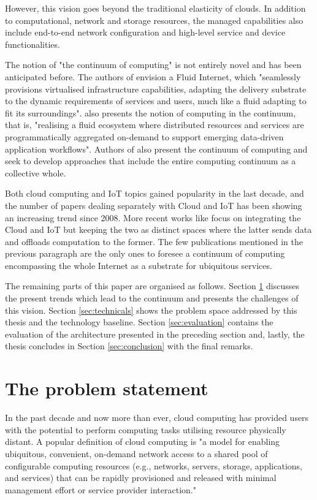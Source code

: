 \documentclass{ieeeaccess}
\begin{document}
However, this vision goes beyond the traditional elasticity of clouds. In addition to computational, network and storage resources, the managed capabilities also include end-to-end network configuration and high-level service and device functionalities.

The notion of "the continuum of computing" is not entirely novel and has been anticipated before. The authors of \cite{fluid-internet} envision a Fluid Internet, which "seamlessly provisions virtualised infrastructure capabilities, adapting the delivery substrate to the dynamic requirements of services and users, much like a fluid adapting to fit its surroundings". \cite{computing-in-continuum} also presents the notion of computing in the continuum, that is, "realising a fluid ecosystem where distributed resources and services are programmatically aggregated on-demand to support emerging data-driven application workflows". Authors of \cite{harnessing-continuum} also present the continuum of computing and seek to develop approaches that include the entire computing continuum as a collective whole.

Both cloud computing and IoT topics gained popularity in the last decade, and the number of papers dealing separately with Cloud and IoT has been showing an increasing trend since 2008. More recent works like \cite{cloud-iot} focus on integrating the Cloud and IoT but keeping the two as distinct spaces where the latter sends data and offloads computation to the former. The few publications mentioned in the previous paragraph are the only ones to foresee a continuum of computing encompassing the whole Internet as a substrate for ubiquitous services.

The remaining parts of this paper are organised as follows. Section \ref{sec:challenges} discusses the present trends which lead to the continuum and presents the challenges of this vision. Section \ref{sec:technicals} shows the problem space addressed by this thesis and the technology baseline. Section \ref{sec:evaluation} contains the evaluation of the architecture presented in the preceding section and, lastly, the thesis concludes in Section \ref{sec:conclusion} with the final remarks.

\section{The problem statement}
\label{sec:challenges}

In the past decade and now more than ever, cloud computing has provided users with the potential to perform computing tasks utilising resource physically distant. A popular definition of cloud computing \cite{cloud-def} is "a model for enabling ubiquitous, convenient, on-demand network access to a shared pool of configurable computing resources (e.g., networks, servers, storage, applications, and services) that can be rapidly provisioned and released with minimal management effort or service provider interaction."
\end{document}
